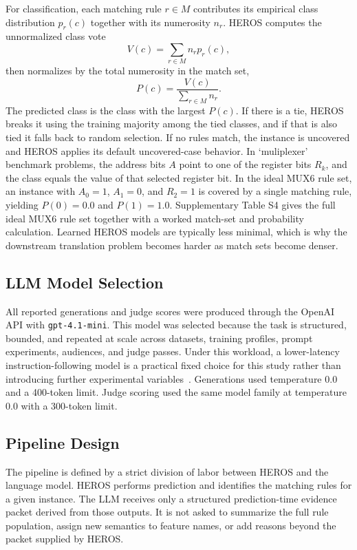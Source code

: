 \documentclass[sigconf]{acmart}
\begin{document}
For classification, each matching rule $r \in M$ contributes its empirical class distribution $p_r(c)$ together with its numerosity $n_r$. HEROS computes the unnormalized class vote
\[
V(c) = \sum_{r \in M} n_r p_r(c),
\]
then normalizes by the total numerosity in the match set,
\[
P(c) = \frac{V(c)}{\sum_{r \in M} n_r}.
\]
The predicted class is the class with the largest $P(c)$. If there is a tie, HEROS breaks it using the training majority among the tied classes, and if that is also tied it falls back to random selection. If no rules match, the instance is uncovered and HEROS applies its default uncovered-case behavior. In `muliplexer' benchmark problems, the address bits $A$ point to one of the register bits $R_k$, and the class equals the value of that selected register bit. In the ideal MUX6 rule set, an instance with $A_0=1$, $A_1=0$, and $R_2=1$ is covered by a single matching rule, yielding $P(0)=0.0$ and $P(1)=1.0$. Supplementary Table S4 gives the full ideal MUX6 rule set together with a worked match-set and probability calculation. Learned HEROS models are typically less minimal, which is why the downstream translation problem becomes harder as match sets become denser.

\subsection{LLM Model Selection}
All reported generations and judge scores were produced through the OpenAI API with \texttt{gpt-4.1-mini}. This model was selected because the task is structured, bounded, and repeated at scale across datasets, training profiles, prompt experiments, audiences, and judge passes. Under this workload, a lower-latency instruction-following model is a practical fixed choice for this study rather than introducing further experimental variables~\cite{openai2025gpt41,openai2025gpt41mini}. Generations used temperature 0.0 and a 400-token limit. Judge scoring used the same model family at temperature 0.0 with a 300-token limit.

\subsection{Pipeline Design}
The pipeline is defined by a strict division of labor between HEROS and the language model. HEROS performs prediction and identifies the matching rules for a given instance. The LLM receives only a structured prediction-time evidence packet derived from those outputs. It is not asked to summarize the full rule population, assign new semantics to feature names, or add reasons beyond the packet supplied by HEROS.
\end{document}
